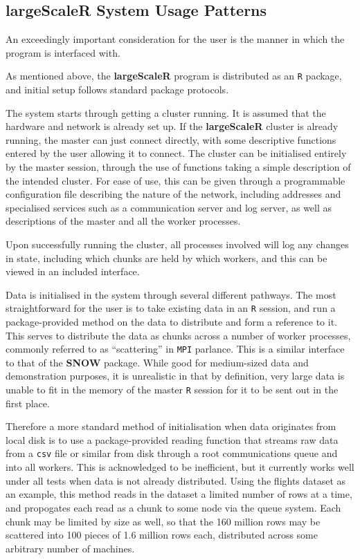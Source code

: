 \subsection{\textbf{largeScaleR} System Usage Patterns}

An exceedingly important consideration for the user is the manner in which the program is interfaced with.

As mentioned above, the \textbf{largeScaleR} program is distributed as an \texttt{R} package, and initial setup follows standard package protocols.

The system starts through getting a cluster running.
It is assumed that the hardware and network is already set up.
If the \textbf{largeScaleR} cluster is already running, the master can just connect directly, with some descriptive functions entered by the user allowing it to connect.
The cluster can be initialised entirely by the master session, through the use of functions taking a simple description of the intended cluster.
For ease of use, this can be given through a programmable configuration file describing the nature of the network, including addresses and specialised services such as a communication server and log server, as well as descriptions of the master and all the worker processes.

Upon successfully running the cluster, all processes involved will log any changes in state, including which chunks are held by which workers, and this can be viewed in an included interface.

Data is initialised in the system through several different pathways.
The most straightforward for the user is to take existing data in an \texttt{R} session, and run a package-provided method on the data to distribute and form a reference to it.
This serves to distribute the data as chunks across a number of worker processes, commonly referred to as ``scattering'' in \texttt{MPI} parlance\cite{walker1996mpi}.
This is a similar interface to that of the \textbf{SNOW} package\cite{tierney18}.
While good for medium-sized data and demonstration purposes, it is unrealistic in that by definition, very large data is unable to fit in the memory of the master \texttt{R} session for it to be sent out in the first place.

Therefore a more standard method of initialisation when data originates from local disk is to use a package-provided reading function that streams raw data from a \texttt{csv} file or similar from disk through a root communications queue and into all workers.
This is acknowledged to be inefficient, but it currently works well under all tests when data is not already distributed.
Using the flights dataset as an example, this method reads in the dataset a limited number of rows at a time, and propogates each read as a chunk to some node via the queue system.
Each chunk may be limited by size as well, so that the 160 million rows may be scattered into 100 pieces of 1.6 million rows each, distributed across some arbitrary number of machines.

